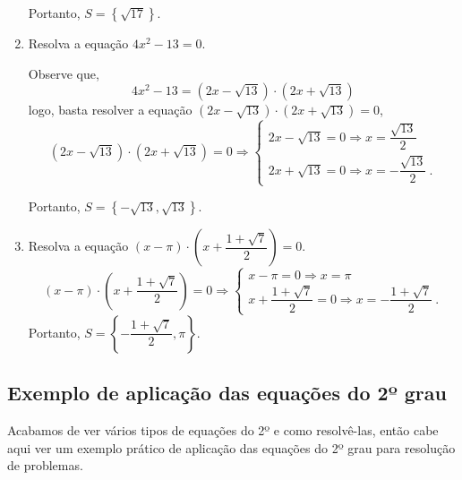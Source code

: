\begin{exem}
\begin{enumerate}[1)]
Portanto, $S= \left\{ \sqrt{17}  \right\}$.

\item Resolva a equação $4x^2 - 13= 0$.

Observe que,
\[4x^2 - 13= (2x - \sqrt{13}) \cdot (2x + \sqrt{13})\]
logo, basta resolver a equação $(2x - \sqrt{13}) \cdot (2x + \sqrt{13})= 0$,
\[(2x - \sqrt{13}) \cdot (2x + \sqrt{13})=0 \Rightarrow
\begin{cases}
 2x - \sqrt{13}=0 \Rightarrow x= \dfrac{\sqrt{13}}{2} \\
 2x + \sqrt{13}= 0 \Rightarrow x= - \dfrac{\sqrt{13}}{2} \ .
\end{cases}\]

Portanto, $S= \left\{ -\sqrt{13}, \sqrt{13}  \right\}$.

\item Resolva a equação $(x - \pi) \cdot \left(x + \dfrac{1 + \sqrt{7}}{2}\right)= 0$.
\[(x - \pi) \cdot \left(x + \dfrac{1 + \sqrt{7}}{2} \right)= 0 \Rightarrow
\begin{cases}
 x - \pi=0 \Rightarrow x= \pi \\
 x + \dfrac{1 + \sqrt{7}}{2} = 0 \Rightarrow x= - \dfrac{1 + \sqrt{7}}{2} \ .
\end{cases} \]
Portanto, $S= \left\{ - \dfrac{1 + \sqrt{7}}{2}, \pi \right\}$.

\end{enumerate}
\end{exem}


\vskip0.3cm
\subsection{Exemplo de aplicação das equações do 2º grau}

Acabamos de ver vários tipos de equações do 2º e como resolvê-las, então cabe aqui ver um exemplo prático de aplicação das equações do 2º grau para resolução de problemas.

